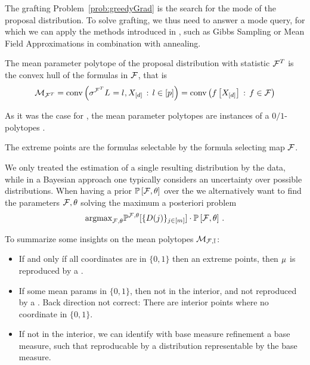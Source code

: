 The grafting Problem~\eqref{prob:greedyGrad} is the search for the mode of the proposal distribution.
To solve grafting, we thus need to answer a mode query, for which we can apply the methods introduced in , such as Gibbs Sampling or Mean Field Approximations in combination with annealing.



The mean parameter polytope of the proposal distribution with statistic $\mathcal{F}^T$ is the convex hull of the formulas in $\mathcal{F}$, that is
\begin{align*}
    \mathcal{M}_{\mathcal{F}^T}
    = \mathrm{conv}\left(\sigma^{\mathcal{F}^T}{L_{}=l_{},X_{[d]}} \, : \, l\in[p]\right)
    = \mathrm{conv}\left(f\left[X_{[d]}\right] \, : \, f\in\mathcal{F}\right)
\end{align*}


As it was the case for \MarkovLogicNetworks{}, the mean parameter polytopes are instances of a $0/1$-polytopes \cite{ziegler_lectures_2000,gillmann_01-polytopes_2007}.

The extreme points are the formulas selectable by the formula selecting map $\mathcal{F}$.



\begin{remark}
    We only treated the estimation of a single resulting distribution by the data, while in a Bayesian approach one typically considers an uncertainty over possible distributions.
    When having a prior $\mathbb{P}\left[\mathcal{F},\theta\right]$ over the \MarkovLogicNetworks{} we alternatively want to find the parameters $\mathcal{F},\theta$ solving the maximum a posteriori problem
    \begin{align}
        \mathrm{argmax}_{\mathcal{F},\theta} \mathbb{P}^{\mathcal{F},\theta}[\{D(j)\}_{j\in[m]}]\cdot \mathbb{P}\left[\mathcal{F},\theta\right]\, .
    \end{align}
\end{remark}

To summarize some insights on the mean polytopes $\mathcal{M}_{\mathcal{F},\mathbb{I}}$:
\begin{itemize}
    \item If and only íf all coordinates are in $\{0,1\}$ then an extreme points, then $\mu$ is reproduced by a \HardLogicNetwork{}.
    \item If some mean params in $\{0,1\}$, then not in the interior, and not reproduced by a \MarkovLogicNetwork{}.
    Back direction not correct: There are interior points where no coordinate in $\{0,1\}$.
    \item If not in the interior, we can identify with base measure refinement a base measure, such that reproducable by a distribution representable by the base measure.
\end{itemize}


